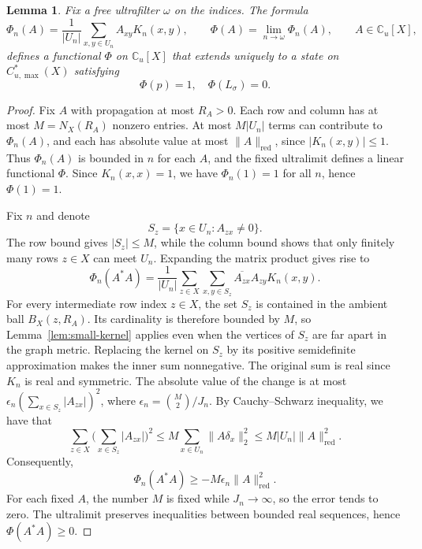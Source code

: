 \documentclass[11pt,a4paper]{article}
\newtheorem{lemma}[theorem]{Lemma}
\theoremstyle{definition}\newtheorem{definition}[theorem]{Definition}
\theoremstyle{remark}\newtheorem{remark}[theorem]{Remark}
\newcommand{\C}{\mathbb C}
\newcommand{\Cum}{C_{u,\max}^*}
\newcommand{\norm}[1]{\lVert#1\rVert}
\begin{document}
\begin{lemma}\label{lem:positive-functional}
Fix a free ultrafilter $\omega$ on the indices. The formula
\begin{equation}\label{eq:state}
\Phi_n(A)=\frac{1}{|U_n|}\sum_{x,y\in U_n} A_{xy}K_n(x,y),
\qquad
\Phi(A)=\lim_{n\to\omega}\Phi_n(A),\qquad A\in\C_u[X],
\end{equation}
defines a functional $\Phi$ on $\C_u[X]$ that extends uniquely
to a state on $\Cum(X)$ satisfying $$\Phi(p)=1, \quad \Phi(L_\sigma)=0.$$
\end{lemma}
\begin{proof}
Fix $A$ with propagation at most $R_A>0$. Each row and column has at
most $M=N_X(R_A)$ nonzero entries. At most $M|U_n|$ terms can contribute
to $\Phi_n(A)$, and each has absolute value at most
$\norm{A}_{\mathrm{red}}$, since $|K_n(x,y)|\le1$.
Thus $\Phi_n(A)$ is bounded in $n$ for each $A$, and the fixed
ultralimit defines a linear functional $\Phi$. Since $K_n(x,x)=1$,
we have $\Phi_n(1)=1$ for all $n$, hence $\Phi(1)=1$.

Fix $n$ and denote
$$S_z=\{x\in U_n:A_{zx}\ne0\}.$$
The row bound gives
$|S_z|\le M$, while the column bound shows that only finitely many
rows $z\in X$ can meet $U_n$. Expanding the matrix product gives rise to
$$
\Phi_n(A^*A)=\frac{1}{|U_n|}
\sum_{z\in X}\sum_{x,y\in S_z}\overline{A_{zx}}A_{zy}K_n(x,y).
$$
For every intermediate row index $z\in X$, the set $S_z$ is
contained in the ambient ball $B_X(z,R_A)$. Its cardinality is
therefore bounded by $M$, so Lemma~\ref{lem:small-kernel} applies
even when the vertices of $S_z$ are far apart in the graph metric.
Replacing the kernel on $S_z$ by its positive semidefinite
approximation makes the
inner sum nonnegative. The original sum is real since $K_n$ is real
and symmetric. The absolute value of the change is at most
$\epsilon_n(\sum_{x\in S_z}|A_{zx}|)^2$, where
$\epsilon_n=\binom{M}{2}/J_n$. By Cauchy--Schwarz inequality, we have that
$$
\sum_{z\in X}\Big(\sum_{x\in S_z}|A_{zx}|\Big)^2
\le M\sum_{x\in U_n}\norm{A\delta_x}_2^2
\le M|U_n|\norm{A}_{\mathrm{red}}^2.
$$
Consequently, 
$$\Phi_n(A^*A)\ge -M\epsilon_n\norm{A}_{\mathrm{red}}^2.$$
For each fixed $A$, the number $M$ is fixed while $J_n\to\infty$,
so the error tends to zero. The ultralimit preserves inequalities
between bounded real sequences, hence
$\Phi(A^*A)\ge0$.


\end{proof}
\end{document}
